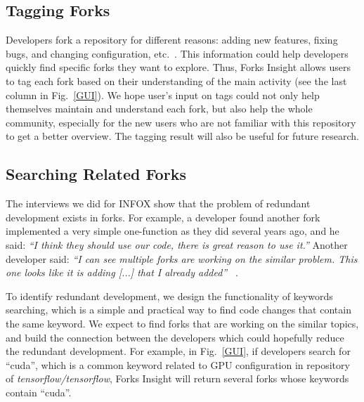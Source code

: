 \subsection{Tagging Forks}
%
Developers fork a repository for different reasons: adding new features, fixing bugs, and changing configuration, etc.~\cite{Mikkonen2011,Robles2012,dubinsky2013exploratory,stanciulescu2015forked}. This information could help developers quickly find specific forks they want to explore. Thus, Forks Insight allows users to tag each fork based on their understanding of the main activity (see the last column in Fig.~\ref{GUI}). We hope user's input on tags could not only help themselves maintain and understand each fork, but also help the whole community, especially for the new users who are not familiar with this repository to get a better overview. The tagging result will also be useful for future research.


\subsection{Searching Related Forks}

The interviews we did for INFOX show that the problem of redundant development exists in forks. For example, a developer found another fork implemented a very simple one-function as they did several years ago, and he said: \emph{``I think they should use our code, there is great reason to use it.''} Another developer said: \emph{``I can see multiple forks are working on the similar problem. This one looks like it is adding [...] that I already added''} ~\cite{ZSLXWK:ICSE18}.

To identify redundant development, we design the functionality of keywords searching, which is a simple and practical way to find code changes that contain the same keyword. We expect to find forks that are working on the similar topics, and build the connection between the developers which could hopefully reduce the redundant development. For example, in Fig.~\ref{GUI}, if developers search for ``cuda'', which is a common keyword related to GPU configuration in repository of \emph{tensorflow/tensorflow}, Forks Insight will return several forks whose keywords contain ``cuda''.
\iffalse
\begin{figure}[H] 
\centering
\texttt{[image: shot2.png]}
\caption{An example of searching for similar forks.}
\vspace{-10pt}

\end{figure}
\fi

